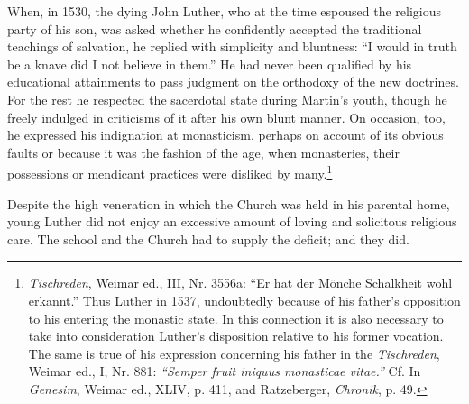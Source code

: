 When, in 1530, the dying John Luther, who
at the time espoused the religious party of his son, was asked
whether he confidently accepted the traditional teachings of salvation,
he replied with simplicity and bluntness: “I would in truth be a
knave did I not believe in them.” He had never been qualified
by his educational attainments to pass judgment on the orthodoxy
of the new doctrines. For the rest he respected the sacerdotal state
during Martin’s youth, though he freely indulged in criticisms of
it after his own blunt manner. On occasion, too, he expressed his
indignation at monasticism, perhaps on account of its obvious faults
or because it was the fashion of the age, when monasteries, their
possessions or mendicant practices were disliked by many.\footnote
{\textit{Tischreden}, Weimar ed., III, Nr. 3556a: ``Er hat der Mönche Schalkheit wohl erkannt.''
Thus Luther in 1537, undoubtedly because of his father’s opposition to his entering the
monastic state. In this connection it is also necessary to take into consideration Luther’s
disposition relative to his former vocation. The same is true of his expression concerning his
father in the \textit{Tischreden}, Weimar ed., I, Nr. 881: \textit{“Semper fruit iniquus monasticae vitae.”}
Cf. In \textit{Genesim}, Weimar ed., XLIV, p. 411, and Ratzeberger, \textit{Chronik}, p. 49.}

Despite the high veneration in which the Church was held in his
parental home, young Luther did not enjoy an excessive amount of
loving and solicitous religious care. The school and the Church had
to supply the deficit; and they did.


